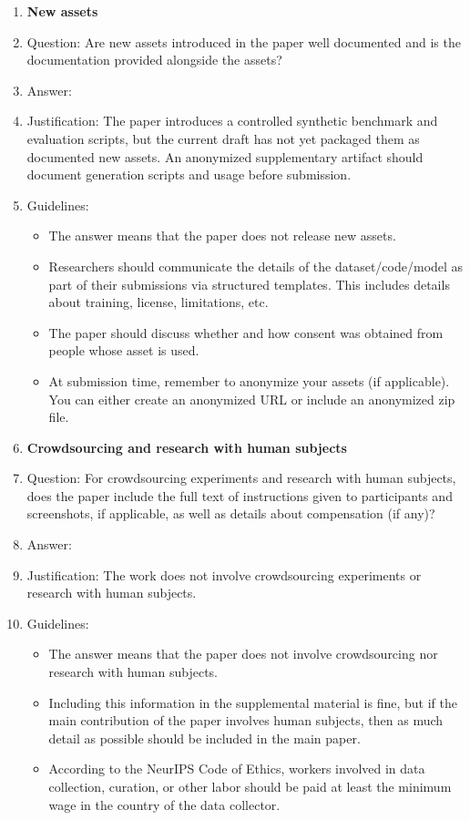 \begin{enumerate}
\item {\bf New assets}
    \item[] Question: Are new assets introduced in the paper well documented and is the documentation provided alongside the assets?
    \item[] Answer: \answerNo{}
    \item[] Justification: The paper introduces a controlled synthetic benchmark and evaluation scripts, but the current draft has not yet packaged them as documented new assets. An anonymized supplementary artifact should document generation scripts and usage before submission.
    \item[] Guidelines:
    \begin{itemize}
        \item The answer \answerNA{} means that the paper does not release new assets.
        \item Researchers should communicate the details of the dataset\slash code\slash model as part of their submissions via structured templates. This includes details about training, license, limitations, etc. 
        \item The paper should discuss whether and how consent was obtained from people whose asset is used.
        \item At submission time, remember to anonymize your assets (if applicable). You can either create an anonymized URL or include an anonymized zip file.
    \end{itemize}

\item {\bf Crowdsourcing and research with human subjects}
    \item[] Question: For crowdsourcing experiments and research with human subjects, does the paper include the full text of instructions given to participants and screenshots, if applicable, as well as details about compensation (if any)? 
    \item[] Answer: \answerNA{}
    \item[] Justification: The work does not involve crowdsourcing experiments or research with human subjects.
    \item[] Guidelines:
    \begin{itemize}
        \item The answer \answerNA{} means that the paper does not involve crowdsourcing nor research with human subjects.
        \item Including this information in the supplemental material is fine, but if the main contribution of the paper involves human subjects, then as much detail as possible should be included in the main paper. 
        \item According to the NeurIPS Code of Ethics, workers involved in data collection, curation, or other labor should be paid at least the minimum wage in the country of the data collector. 
    \end{itemize}


\end{enumerate}
